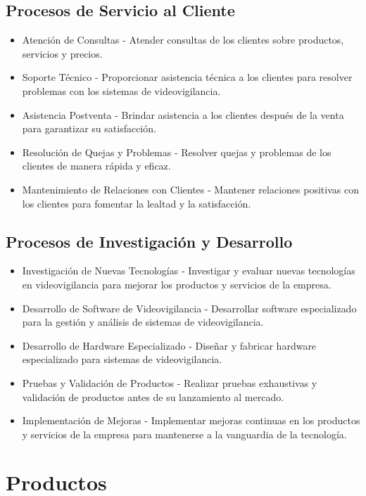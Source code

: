 \documentclass{report}
\begin{document}
          \subsection{Procesos de Servicio al Cliente}
            \begin{itemize}
              \item Atención de Consultas - Atender consultas de los clientes sobre productos, servicios y precios.
              \item Soporte Técnico - Proporcionar asistencia técnica a los clientes para resolver problemas con los sistemas de videovigilancia.
              \item Asistencia Postventa - Brindar asistencia a los clientes después de la venta para garantizar su satisfacción.
              \item Resolución de Quejas y Problemas - Resolver quejas y problemas de los clientes de manera rápida y eficaz.
              \item Mantenimiento de Relaciones con Clientes - Mantener relaciones positivas con los clientes para fomentar la lealtad y la satisfacción.
            \end{itemize}
          \subsection{Procesos de Investigación y Desarrollo}
            \begin{itemize}
              \item Investigación de Nuevas Tecnologías - Investigar y evaluar nuevas tecnologías en videovigilancia para mejorar los productos y servicios de la empresa.
              \item Desarrollo de Software de Videovigilancia - Desarrollar software especializado para la gestión y análisis de sistemas de videovigilancia.
              \item Desarrollo de Hardware Especializado - Diseñar y fabricar hardware especializado para sistemas de videovigilancia.
              \item Pruebas y Validación de Productos - Realizar pruebas exhaustivas y validación de productos antes de su lanzamiento al mercado.
              \item Implementación de Mejoras - Implementar mejoras continuas en los productos y servicios de la empresa para mantenerse a la vanguardia de la tecnología.
            \end{itemize}
        \clearpage\section{Productos}
\end{document}
